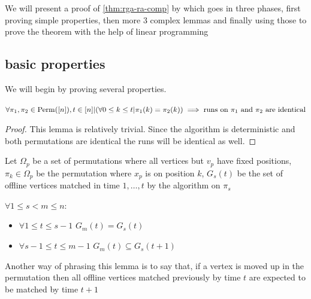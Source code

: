 We will present a proof of \autoref{thm:rga-ra-comp} by \cite{obmRaGreedy} which goes in three phases, first proving simple properties, then more 3 complex lemmas and finally using those to prove the theorem with the help of linear programming
\newcommand*\xigma{\pi}

\subsection{basic properties}

We will begin by proving several properties.
\begin{lemma}[Prefix]
	\label{ra-greedy-prefix}
	$\forall\xigma_1,\xigma_2\in\mathrm{Perm}([n]),t\in[n]|(\forall 0\leq k\leq t| \xigma_1(k)=\xigma_2(k))\\ \implies\text{runs on }\xigma_1\ \text{and}\ \xigma_2\ \text{are identical}$
\end{lemma}
\begin{proof}
	This lemma is relatively trivial. Since the algorithm is deterministic and both permutations are identical the runs will be identical as well.
\end{proof}

Let $\Omega_p$ be a set of permutations where all vertices but $v_p$ have fixed positions, $\xigma_k\in\Omega_p$ be the permutation where $x_p$ is on position $k$, $G_s(t)$ be the set of offline vertices matched in time $1,\dots,t$ by the algorithm on $\xigma_s$

\begin{lemma}[Monotonicity]
	\label{ra-greedy-monotone}
	$\forall 1\leq s<m\leq n$:
	\begin{itemize}
		\item $\forall 1\leq t\leq s-1$ $G_m(t)=G_s(t)$
		\item $\forall s-1\leq t\leq m-1$ $G_m(t)\subseteq G_s(t+1)$
	\end{itemize}
\end{lemma}

Another way of phrasing this lemma is to say that, if a vertex is moved up in the permutation then all offline vertices matched previously by time $t$ are expected to be matched by time $t+1$

